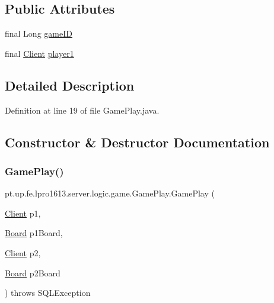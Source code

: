 \subsection*{Public Attributes}
\begin{DoxyCompactItemize}
\item 
final Long \hyperlink{classpt_1_1up_1_1fe_1_1lpro1613_1_1server_1_1logic_1_1game_1_1_game_play_a9866aed542d7230589214b7297c19103}{game\+ID}
\item 
final \hyperlink{classpt_1_1up_1_1fe_1_1lpro1613_1_1server_1_1conn_1_1_client}{Client} \hyperlink{classpt_1_1up_1_1fe_1_1lpro1613_1_1server_1_1logic_1_1game_1_1_game_play_a3dee975f8da8d824316eabe983eb4080}{player1}
\end{DoxyCompactItemize}


\subsection{Detailed Description}


Definition at line 19 of file Game\+Play.\+java.



\subsection{Constructor \& Destructor Documentation}
\hypertarget{classpt_1_1up_1_1fe_1_1lpro1613_1_1server_1_1logic_1_1game_1_1_game_play_a9d441d2cde1a58ceeaafdc2785f4b017}{}\label{classpt_1_1up_1_1fe_1_1lpro1613_1_1server_1_1logic_1_1game_1_1_game_play_a9d441d2cde1a58ceeaafdc2785f4b017} 
\subsubsection{\texorpdfstring{Game\+Play()}{GamePlay()}}
{\footnotesize\ttfamily pt.\+up.\+fe.\+lpro1613.\+server.\+logic.\+game.\+Game\+Play.\+Game\+Play (\begin{DoxyParamCaption}\item[{\hyperlink{classpt_1_1up_1_1fe_1_1lpro1613_1_1server_1_1conn_1_1_client}{Client}}]{p1,  }\item[{\hyperlink{classpt_1_1up_1_1fe_1_1lpro1613_1_1server_1_1logic_1_1game_1_1_board}{Board}}]{p1\+Board,  }\item[{\hyperlink{classpt_1_1up_1_1fe_1_1lpro1613_1_1server_1_1conn_1_1_client}{Client}}]{p2,  }\item[{\hyperlink{classpt_1_1up_1_1fe_1_1lpro1613_1_1server_1_1logic_1_1game_1_1_board}{Board}}]{p2\+Board }\end{DoxyParamCaption}) throws S\+Q\+L\+Exception}



